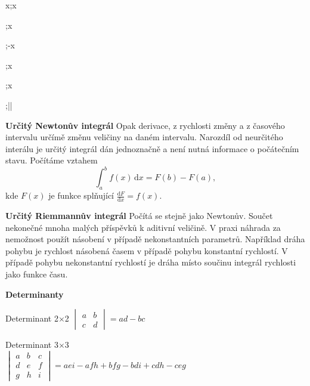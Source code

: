 \documentclass{article}
\def\tg{\mathop{\mathrm{tg}}}
\def\arctg{\mathop{\mathrm{arctg}}}
\def\cotg{\mathop{\mathrm{cotg}}}
\begin{document}
\begin{multicols}{3}
{{\begin{minipage}[t]{0.42\linewidth}
  \integral \cos x;\sin x

\end{minipage}\hfil\vrule\hfil
\begin{minipage}[t]{0.53\linewidth}
\parskip 3pt

  \integral {};\tg x

  \integral {};-\cotg x


  \integral {};\arcsin x

  \integral {};\arctg x

  \integral {};\ln\left|\right|

\end{minipage}}
}



\textbf{Určitý Newtonův integrál} Opak derivace, z rychlosti změny a z časového intervalu určímě změnu veličiny na daném intervalu. Narozdíl od neurčitého interálu je určitý integrál dán jednoznačně a není nutná informace o počátečním stavu. Počítáme vztahem 
$$\int_a^bf(x)\,\mathrm dx=F(b)-F(a),$$
kde $F(x)$ je funkce splňující $\frac{\mathrm dF}{\mathrm dx}=f(x).$

\textbf{Určitý Riemmannův integrál} Počítá se stejně jako Newtonův. Součet nekonečné mnoha malých příspěvků k aditivní veličině. V praxi náhrada za nemožnost použít násobení v případě nekonstantních parametrů. Například dráha pohybu je rychlost násobená časem v případě pohybu konstantní rychlostí. V případě pohybu nekonstantní rychlostí je dráha místo součinu integrál rychlosti jako funkce času. 




\textbf{Determinanty}

\let\oldtextbf\textbf
\def\textbf{\smallskip\hrule\oldtextbf}
\vspace*{-10pt}

Determinant 2$\times$2 \hfill$
\begin{vmatrix}
  a & b \\ c &d
\end{vmatrix}
=ad-bc
$

Determinant 3$\times$3 \\\null\hfill$
\begin{vmatrix}
  a & b & c \\ d & e &f \\ g & h & i
\end{vmatrix}
=aei-afh+bfg-bdi+cdh-ceg
$\hfill\null


\end{multicols}
\end{document}
